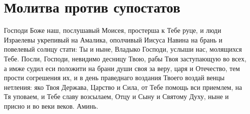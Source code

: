 \section{Молитва против супостатов}\begin{mymulticols}
 

Господи Боже наш, послушавый Моисея, простерша к Тебе руце, и люди Израелевы укрепивый на Амалика, ополчивый Иисуса Навина на брань и повелевый солнцу стати: Ты и ныне, Владыко Господи, услыши нас, молящихся Тебе. Посли, Господи, невидимо десницу Твою, рабы Твоя заступающую во всех, а имже судил еси положити на брани души своя за веру,  царя и Отечество, тем прости согрешения их, и в день праведнаго воздания Твоего воздай венцы нетления: яко Твоя Держава, Царство и Сила, от Тебе помощь вси приемлем, на Тя уповаем, и Тебе славу возсылаем, Отцу и Сыну и Святому Духу, ныне и присно и во веки веков. Аминь.

\end{mymulticols}

